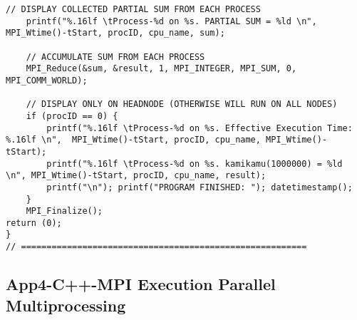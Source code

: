 \begin{lstlisting}[caption={App4-C++-MPI Example Parallel Multiprocessing}, label=App4-C++-MPI Example Parallel Multiprocessing]
	// DISPLAY COLLECTED PARTIAL SUM FROM EACH PROCESS
	printf("%.16lf \tProcess-%d on %s. PARTIAL SUM = %ld \n", MPI_Wtime()-tStart, procID, cpu_name, sum);

	// ACCUMULATE SUM FROM EACH PROCESS
	MPI_Reduce(&sum, &result, 1, MPI_INTEGER, MPI_SUM, 0, MPI_COMM_WORLD);

	// DISPLAY ONLY ON HEADNODE (OTHERWISE WILL RUN ON ALL NODES)
	if (procID == 0) {
		printf("%.16lf \tProcess-%d on %s. Effective Execution Time: %.16lf \n",  MPI_Wtime()-tStart, procID, cpu_name, MPI_Wtime()-tStart);
		printf("%.16lf \tProcess-%d on %s. kamikamu(1000000) = %ld \n", MPI_Wtime()-tStart, procID, cpu_name, result);
		printf("\n"); printf("PROGRAM FINISHED: "); datetimestamp();
	}
	MPI_Finalize();
return (0);
}
// ========================================================
\end{lstlisting}

\pagebreak
\subsection{App4-C++-MPI Execution Parallel Multiprocessing}


